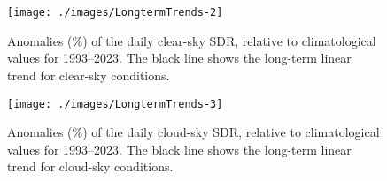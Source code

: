 
%
%
%
%



\appendixstart
\appendix
\section[\appendixname~\thesection]{}
\label{appendix}



\begin{figure}[h!]
    {\centering
        \texttt{[image: ./images/LongtermTrends-2]}

    }
    \caption{Anomalies (\%) of the daily clear-sky SDR, relative to climatological values for 1993--2023. The black line shows the long-term linear trend for clear-sky conditions.}\label{fig:trendCLEAR}
\end{figure}



\begin{figure}[h!]
    {\centering
        \texttt{[image: ./images/LongtermTrends-3]}

    }
    \caption{Anomalies (\%) of the daily cloud-sky SDR, relative to climatological values for 1993--2023. The black line shows the long-term linear trend for cloud-sky conditions.}\label{fig:trendCLOUD}
\end{figure}



